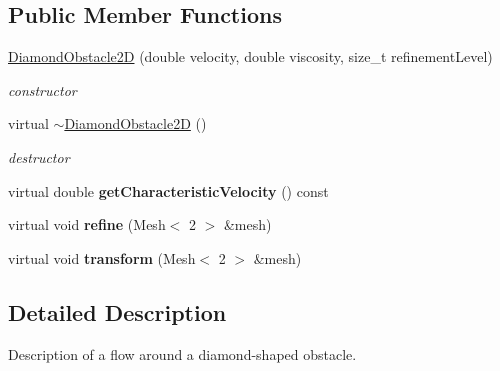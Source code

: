 \subsection*{Public Member Functions}
\begin{DoxyCompactItemize}
\item 
\hyperlink{classnatrium_1_1DiamondObstacle2D_a466c22e26de373b06ccba9c5e0a23c33}{DiamondObstacle2D} (double velocity, double viscosity, size\_\-t refinementLevel)
\begin{DoxyCompactList}\small\item\em constructor \item\end{DoxyCompactList}\item 
\hypertarget{classnatrium_1_1DiamondObstacle2D_a96119fe50e043dae093912884798d9a5}{
virtual \hyperlink{classnatrium_1_1DiamondObstacle2D_a96119fe50e043dae093912884798d9a5}{$\sim$DiamondObstacle2D} ()}
\label{classnatrium_1_1DiamondObstacle2D_a96119fe50e043dae093912884798d9a5}

\begin{DoxyCompactList}\small\item\em destructor \item\end{DoxyCompactList}\item 
\hypertarget{classnatrium_1_1DiamondObstacle2D_a9edc6d74879f7edd811b7180c1156a04}{
virtual double {\bfseries getCharacteristicVelocity} () const }
\label{classnatrium_1_1DiamondObstacle2D_a9edc6d74879f7edd811b7180c1156a04}

\item 
\hypertarget{classnatrium_1_1DiamondObstacle2D_a6fd173230aeb5e15db27d7f2a752df5a}{
virtual void {\bfseries refine} (Mesh$<$ 2 $>$ \&mesh)}
\label{classnatrium_1_1DiamondObstacle2D_a6fd173230aeb5e15db27d7f2a752df5a}

\item 
\hypertarget{classnatrium_1_1DiamondObstacle2D_ab0c299caa86137df117678b3be5e1195}{
virtual void {\bfseries transform} (Mesh$<$ 2 $>$ \&mesh)}
\label{classnatrium_1_1DiamondObstacle2D_ab0c299caa86137df117678b3be5e1195}

\end{DoxyCompactItemize}


\subsection{Detailed Description}
Description of a flow around a diamond-\/shaped obstacle. 

